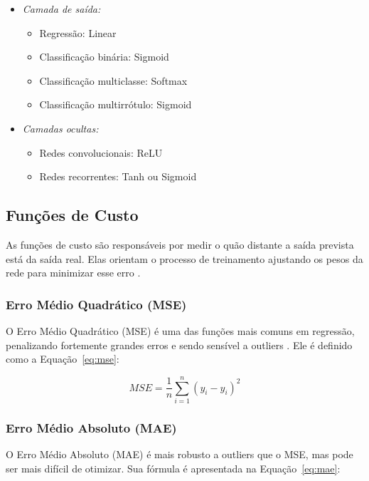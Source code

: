\begin{itemize}
    \item \textit{Camada de saída:}
    \begin{itemize}
        \item Regressão: Linear
        \item Classificação binária: Sigmoid
        \item Classificação multiclasse: Softmax
        \item Classificação multirrótulo: Sigmoid
    \end{itemize}
    \item \textit{Camadas ocultas:}
    \begin{itemize}
        \item Redes convolucionais: ReLU
        \item Redes recorrentes: Tanh ou Sigmoid
    \end{itemize}
\end{itemize}

\subsection{Funções de Custo}

As funções de custo são responsáveis por medir o quão distante a saída prevista está da saída real. Elas orientam o processo de treinamento ajustando os pesos da rede para minimizar esse erro \cite{rashid2020survey}.

\subsubsection{Erro Médio Quadrático (MSE)}

O Erro Médio Quadrático (MSE) é uma das funções mais comuns em regressão, penalizando fortemente grandes erros e sendo sensível a outliers \cite{chicco2021advantages}. Ele é definido como a Equação~\ref{eq:mse}:

\begin{equation}
    MSE = \frac{1}{n} \sum_{i=1}^{n} (y_i - \hat{y}_i)^2
    \label{eq:mse}
\end{equation}

\subsubsection{Erro Médio Absoluto (MAE)}

O Erro Médio Absoluto (MAE) é mais robusto a outliers que o MSE, mas pode ser mais difícil de otimizar. Sua fórmula é apresentada na Equação~\ref{eq:mae}:

